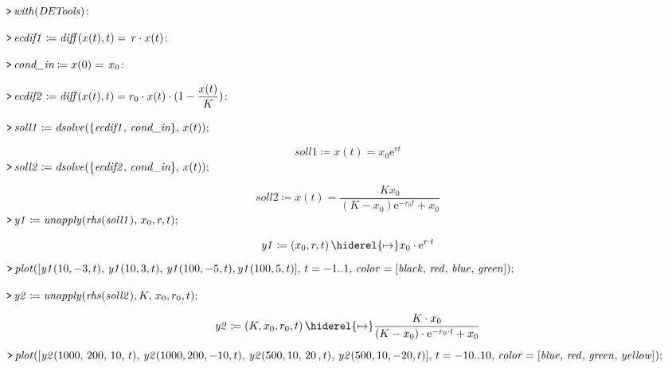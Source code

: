 \documentclass{article}
\begin{document}
\mapleinput
{$ \displaystyle \texttt{>\,} \mathit{with} (\mathit{DETools})\colon  $}

\mapleinput
{$ \displaystyle \texttt{>\,} \mathit{ecdif1} \coloneqq \mathit{diff} (x (t),t)=\,r \cdot x (t)\colon  $}

\mapleinput
{$ \displaystyle \texttt{>\,} \textit{cond\_in} \coloneqq x (0)=\,x_{0}\colon  $}

\mapleinput
{$ \displaystyle \texttt{>\,} \mathit{ecdif2} \coloneqq \mathit{diff} (x (t),t)=r_{0}\cdot x (t)\cdot (1-\frac{x (t)}{K})\colon  $}

\mapleinput
{$ \displaystyle \texttt{>\,} \mathit{soll1} \coloneqq \mathit{dsolve} (\{\mathit{ecdif1} ,\,\textit{cond\_in} \},\,x (t)); $}

\begin{dmath}\label{(9)}
\mathit{soll1} \coloneqq x \! \left(t \right)=x_{0} {\mathrm e}^{r t}
\end{dmath}
\mapleinput
{$ \displaystyle \texttt{>\,} \mathit{soll2} \coloneqq \mathit{dsolve} (\{\mathit{ecdif2} ,\,\textit{cond\_in} \},\,x (t)); $}

\begin{dmath}\label{(10)}
\mathit{soll2} \coloneqq x \! \left(t \right)=\frac{K x_{0}}{\left(K -x_{0}\right) {\mathrm e}^{-r_{0} t}+x_{0}}
\end{dmath}
\mapleinput
{$ \displaystyle \texttt{>\,} \mathit{y1} \coloneqq \mathit{unapply} (\mathit{rhs} (\mathit{soll1}),\,x_{0},r ,t); $}

\begin{dmath}\label{(11)}
\mathit{y1} \coloneqq \left(x_{0},r ,t \right)\hiderel{\mapsto }x_{0}\cdot {\mathrm e}^{r \cdot t}
\end{dmath}
\mapleinput
{$ \displaystyle \texttt{>\,} \mathit{plot} ([\mathit{y1} (10,-3,t),\,\mathit{y1} (10,3,t),\,\mathit{y1} (100,-5,t),\mathit{y1} (100,5,t)],\,t =-1..1,\,\mathit{color} =[\mathit{black} ,\,\mathit{red} ,\,\mathit{blue} ,\,\mathit{green}]); $}

{}
\mapleinput
{$ \displaystyle \texttt{>\,} \mathit{y2} \coloneqq \mathit{unapply} (\mathit{rhs} (\mathit{soll2}),K ,\,x_{0},r_{0},t); $}

\begin{dmath}\label{(12)}
\mathit{y2} \coloneqq \left(K ,x_{0},r_{0},t \right)\hiderel{\mapsto }\frac{K \cdot x_{0}}{\left(K -x_{0}\right)\cdot {\mathrm e}^{-r_{0}\cdot t}+x_{0}}
\end{dmath}
\mapleinput
{$ \displaystyle \texttt{>\,} \mathit{plot} ([\mathit{y2} (1000,\,200,\,10,\,t),\,\mathit{y2} (1000,200,-10,t),\,\mathit{y2} (500,10,\,20\,,t),\,\mathit{y2} (500,10,-20,t)],\,t =-10..10,\,\mathit{color} =[\mathit{blue} ,\,\mathit{red} ,\,\mathit{green} ,\,\mathit{yellow}]); $}
\end{document}

